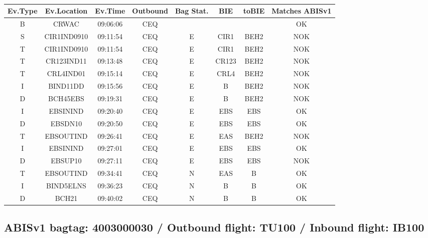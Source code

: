 \documentclass{report}
\begin{document}
\paragraph{}
\begin{longtable}{cccccccc}    \toprule
\rowcolor{white!50}
\textbf{Ev.Type} & \textbf{Ev.Location} & \textbf{Ev.Time} & \textbf{Outbound} & \textbf{Bag Stat.} & \textbf{BIE} & \textbf{toBIE} & \textbf{Matches ABISv1} \\\midrule
B & CRWAC & 09:06:06  & CEQ &  &  &  & OK\\
S & CIR1IND0910 & 09:11:54  & CEQ & E & CIR1 & BEH2 & NOK\\
T & CIR1IND0910 & 09:11:54  & CEQ & E & CIR1 & BEH2 & NOK\\
T & CR123IND11 & 09:13:48  & CEQ & E & CR123 & BEH2 & NOK\\
T & CRL4IND01 & 09:15:14  & CEQ & E & CRL4 & BEH2 & NOK\\
I & BIND11DD & 09:15:56  & CEQ & E & B & BEH2 & NOK\\
D & BCH45EBS & 09:19:31  & CEQ & E & B & BEH2 & NOK\\
I & EBSININD & 09:20:40  & CEQ & E & EBS & EBS & OK\\
D & EBSDN10 & 09:20:50  & CEQ & E & EBS & EBS & OK\\
T & EBSOUTIND & 09:26:41  & CEQ & E & EAS & BEH2 & NOK\\
I & EBSININD & 09:27:01  & CEQ & E & EBS & EBS & OK\\
D & EBSUP10 & 09:27:11  & CEQ & E & EBS & EBS & NOK\\
T & EBSOUTIND & 09:34:41  & CEQ & N & EAS & B & OK\\
I & BIND5ELNS & 09:36:23  & CEQ & N & B & B & OK\\
D & BCH21 & 09:40:02  & CEQ & N & B & B & OK\\
\bottomrule
\end{longtable}
\subsection*{ABISv1 bagtag: 4003000030 / Outbound flight: TU100 / Inbound flight: IB100}
\end{document}

